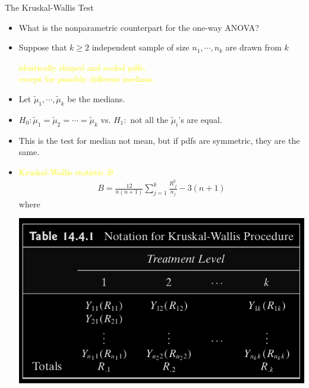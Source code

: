 \begin{frame}{The Kruskal-Wallis Test}
	\begin{itemize}
		\item[] What is the nonparametric counterpart for the one-way ANOVA?
		\bigskip
	\item[Setup] Suppose that $k\ge 2$ independent sample of size $n_1,\cdots,n_k$ are drawn from $k$
		\begin{center}
			\textcolor{yellow}{identically shaped and scaled pdfs,}\\
			\textcolor{yellow}{except for possibly different medians.}
		\end{center}
			\bigskip
		\item[] Let $\widetilde{\mu}_1,\cdots,\widetilde{\mu}_k$ be the medians.
			\bigskip
		\item[Test] $H_0:\widetilde{\mu}_1=\widetilde{\mu}_2=\cdots=\widetilde{\mu}_k$ vs. $ H_1:$ not all the $\widetilde{\mu}_i$'s are equal.
			\bigskip
		\item[Remark] This is the test for median not mean, but if pdfs are symmetric, they are the same.
	\end{itemize}
\end{frame}
\begin{frame}[fragile]
\begin{itemize}
	\item[] \textcolor{yellow}{Kruskal-Wallis statistic $B$}
	\begin{align*}
		B= \frac{12}{n(n+1)}\sum_{j=1}^k \frac{R_{\cdot j}^2}{n_j} -3(n+1)
	\end{align*}
	where
	\begin{center}
		\includegraphics[scale=0.3]{Codes/Table14-4-1.png}
	\end{center}
\end{itemize}
\end{frame}

